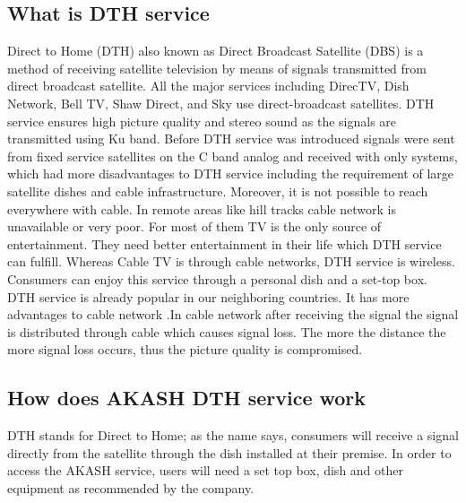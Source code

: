 \begin{spacing}{1.0}
\subsection{What is DTH service}
Direct to Home (DTH) also known as Direct Broadcast Satellite (DBS) is a method of receiving satellite television by means of signals transmitted from direct broadcast satellite. All the major services including DirecTV, Dish Network, Bell TV, Shaw Direct, and Sky use direct-broadcast satellites. DTH service ensures high picture quality and stereo sound as the signals are transmitted using Ku band.
Before DTH service was introduced signals were sent from fixed service satellites on the C band analog and received with only systems, which had more disadvantages to DTH service including the requirement of large satellite dishes and cable infrastructure. Moreover, it is not possible to reach everywhere with cable. In remote areas like hill tracks cable network is unavailable or very poor. For most of them TV is the only source of entertainment. They need better entertainment in their life which DTH service can fulfill. Whereas Cable TV is through cable networks, DTH service is wireless. Consumers can enjoy this service through a personal dish and a set-top box. DTH service is already popular in our neighboring countries. It has more advantages to cable network .In cable network after receiving the signal the signal is distributed through cable which causes signal loss. The more the distance the more signal loss occurs, thus the picture quality is compromised.
\subsection{How does AKASH DTH service work}
DTH stands for Direct to Home; as the name says, consumers will receive a signal directly from the satellite through the dish installed at their premise. In order to access the AKASH service, users will need a set top box, dish and other equipment as recommended by the company. 

\end{spacing}
